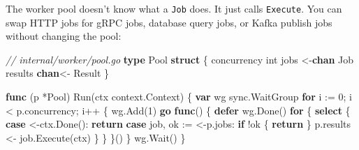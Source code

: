 \documentclass[
]{article}
\newenvironment{Shaded}{}{}
\newcommand{\CommentTok}[1]{\textcolor[rgb]{0.38,0.63,0.69}{\textit{#1}}}
\newcommand{\ControlFlowTok}[1]{\textcolor[rgb]{0.00,0.44,0.13}{\textbf{#1}}}
\newcommand{\DataTypeTok}[1]{\textcolor[rgb]{0.56,0.13,0.00}{#1}}
\newcommand{\DecValTok}[1]{\textcolor[rgb]{0.25,0.63,0.44}{#1}}
\newcommand{\KeywordTok}[1]{\textcolor[rgb]{0.00,0.44,0.13}{\textbf{#1}}}
\newcommand{\NormalTok}[1]{#1}
\newcommand{\OperatorTok}[1]{\textcolor[rgb]{0.40,0.40,0.40}{#1}}
\begin{document}
The worker pool doesn't know what a \texttt{Job} does. It just calls
\texttt{Execute}. You can swap HTTP jobs for gRPC jobs, database query
jobs, or Kafka publish jobs without changing the pool:

\begin{Shaded}
\begin{Highlighting}[]
\CommentTok{// internal/worker/pool.go}
\KeywordTok{type}\NormalTok{ Pool }\KeywordTok{struct} \OperatorTok{\{}
\NormalTok{    concurrency }\DataTypeTok{int}
\NormalTok{    jobs        }\OperatorTok{\textless{}{-}}\KeywordTok{chan}\NormalTok{ Job}
\NormalTok{    results     }\KeywordTok{chan}\OperatorTok{\textless{}{-}}\NormalTok{ Result}
\OperatorTok{\}}

\KeywordTok{func} \OperatorTok{(}\NormalTok{p }\OperatorTok{*}\NormalTok{Pool}\OperatorTok{)}\NormalTok{ Run}\OperatorTok{(}\NormalTok{ctx context}\OperatorTok{.}\NormalTok{Context}\OperatorTok{)} \OperatorTok{\{}
    \KeywordTok{var}\NormalTok{ wg sync}\OperatorTok{.}\NormalTok{WaitGroup}
    \ControlFlowTok{for}\NormalTok{ i }\OperatorTok{:=} \DecValTok{0}\OperatorTok{;}\NormalTok{ i }\OperatorTok{\textless{}}\NormalTok{ p}\OperatorTok{.}\NormalTok{concurrency}\OperatorTok{;}\NormalTok{ i}\OperatorTok{++} \OperatorTok{\{}
\NormalTok{        wg}\OperatorTok{.}\NormalTok{Add}\OperatorTok{(}\DecValTok{1}\OperatorTok{)}
        \ControlFlowTok{go} \KeywordTok{func}\OperatorTok{()} \OperatorTok{\{}
            \ControlFlowTok{defer}\NormalTok{ wg}\OperatorTok{.}\NormalTok{Done}\OperatorTok{()}
            \ControlFlowTok{for} \OperatorTok{\{}
                \ControlFlowTok{select} \OperatorTok{\{}
                \ControlFlowTok{case} \OperatorTok{\textless{}{-}}\NormalTok{ctx}\OperatorTok{.}\NormalTok{Done}\OperatorTok{():}
                    \ControlFlowTok{return}
                \ControlFlowTok{case}\NormalTok{ job}\OperatorTok{,}\NormalTok{ ok }\OperatorTok{:=} \OperatorTok{\textless{}{-}}\NormalTok{p}\OperatorTok{.}\NormalTok{jobs}\OperatorTok{:}
                    \ControlFlowTok{if} \OperatorTok{!}\NormalTok{ok }\OperatorTok{\{}
                        \ControlFlowTok{return}
                    \OperatorTok{\}}
\NormalTok{                    p}\OperatorTok{.}\NormalTok{results }\OperatorTok{\textless{}{-}}\NormalTok{ job}\OperatorTok{.}\NormalTok{Execute}\OperatorTok{(}\NormalTok{ctx}\OperatorTok{)}
                \OperatorTok{\}}
            \OperatorTok{\}}
        \OperatorTok{\}()}
    \OperatorTok{\}}
\NormalTok{    wg}\OperatorTok{.}\NormalTok{Wait}\OperatorTok{()}
\OperatorTok{\}}
\end{Highlighting}
\end{Shaded}
\end{document}
